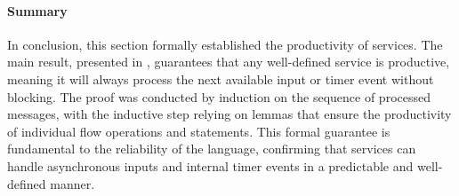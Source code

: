 \paragraph{Summary}
In conclusion, this section formally established the productivity of \GRFRP services. The main
result, presented in , guarantees that any
well-defined service is productive, meaning it will always process the next available input or timer
event without blocking.
%
The proof was conducted by induction on the sequence of processed messages, with the inductive step
relying on lemmas that ensure the productivity of individual flow operations and statements.
%
This formal guarantee is fundamental to the reliability of the language, confirming that services
can handle asynchronous inputs and internal timer events in a predictable and well-defined manner.
